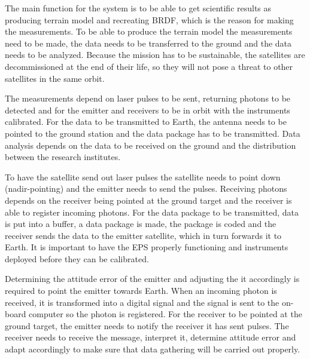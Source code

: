 The main function for the system is to be able to get scientific results as producing terrain model and recreating \acs{BRDF}, which is the reason for making the measurements. To be able to produce the terrain model the measurements need to be made, the data needs to be transferred to the ground and the data needs to be analyzed. Because the mission has to be sustainable, the satellites are decommissioned at the end of their life, so they will not pose a threat to other satellites in the same orbit.

The measurements depend on laser pulses to be sent, returning photons to be detected and for the emitter and receivers to be in orbit with the instruments calibrated. For the data to be transmitted to Earth, the antenna needs to be pointed to the ground station and the data package has to be transmitted. Data analysis depends on the data to be received on the ground and the distribution between the research institutes.

To have the satellite send out laser pulses the satellite needs to point down (nadir-pointing) and the emitter needs to send the pulses. Receiving photons depends on the receiver being pointed at the ground target and the receiver is able to register incoming photons. For the data package to be transmitted, data is put into a buffer, a data package is made, the package is coded and the receiver sends the data to the emitter satellite, which in turn forwards it to Earth. It is important to have the \ac{EPS} properly functioning and instruments deployed before they can be calibrated.

Determining the attitude error of the emitter and adjusting the it accordingly is required to point the emitter towards Earth. When an incoming photon is received, it is transformed into a digital signal and the signal is sent to the on-board computer so the photon is registered. For the receiver to be pointed at the ground target, the emitter needs to notify the receiver it has sent pulses. The receiver needs to receive the message, interpret it, determine attitude error and adapt accordingly to make sure that data gathering will be carried out properly. 

